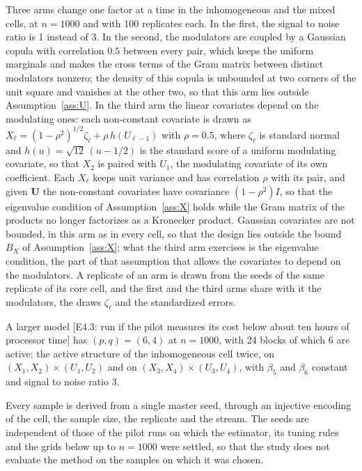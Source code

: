 \documentclass[12pt]{article} %
\theoremstyle{definition}
\theoremstyle{plain}
\newcommand{\cv}{\ell}
\newcommand{\bU}{\mathbf{U}}
\begin{document}
{Three arms change one factor at a time in the inhomogeneous and the mixed
cells, at $n = 1000$ and with 100 replicates each. In the first, the signal to
noise ratio is 1 instead of 3. In the second, the modulators are coupled by a
Gaussian copula with correlation $0.5$ between every pair, which keeps the
uniform marginals and makes the cross terms of the Gram matrix between
distinct modulators nonzero; the density of this copula is unbounded at two
corners of the unit square and vanishes at the other two, so that this arm
lies outside Assumption~\ref{ass:U}. In the third arm the linear covariates
depend on the modulating ones: each non-constant covariate is drawn as
$X_\cv = (1-\rho^2)^{1/2} \zeta_\cv + \rho\, h(U_{\cv-1})$ with $\rho = 0.5$,
where $\zeta_\cv$ is standard normal and $h(u) = \sqrt{12}\,(u - 1/2)$ is the
standard score of a uniform modulating covariate, so that $X_2$ is paired with
$U_1$, the modulating covariate of its own coefficient. Each $X_\cv$ keeps
unit variance and has correlation $\rho$ with its pair, and given $\bU$ the
non-constant covariates have covariance $(1-\rho^2)I$, so that the eigenvalue
condition of Assumption~\ref{ass:X} holds while the Gram matrix of the
products no longer factorizes as a Kronecker product. Gaussian covariates are
not bounded, in this arm as in every cell, so that the design lies outside the
bound $B_X$ of Assumption~\ref{ass:X}; what the third arm exercises is the
eigenvalue condition, the part of that assumption that allows the covariates
to depend on the modulators. A replicate of an arm is drawn from the seeds of
the same replicate of its core cell, and the first and the third arms share
with it the modulators, the draws $\zeta_\cv$ and the standardized errors.

A larger model [E4.3: run if the pilot measures its cost below about ten hours
of processor time] has $(p,q) = (6,4)$ at $n = 1000$, with 24 blocks of which
6 are active: the active structure of the inhomogeneous cell twice, on
$(X_1,X_2)\times(U_1,U_2)$ and on $(X_3,X_4)\times(U_3,U_4)$, with $\beta_5$
and $\beta_6$ constant and signal to noise ratio 3.

Every sample is derived from a single master seed, through an injective
encoding of the cell, the sample size, the replicate and the stream. The seeds
are independent of those of the pilot runs on which the estimator, its tuning
rules and the grids below up to $n = 1000$ were settled, so that the study does not evaluate
the method on the samples on which it was chosen.

}
\end{document}
